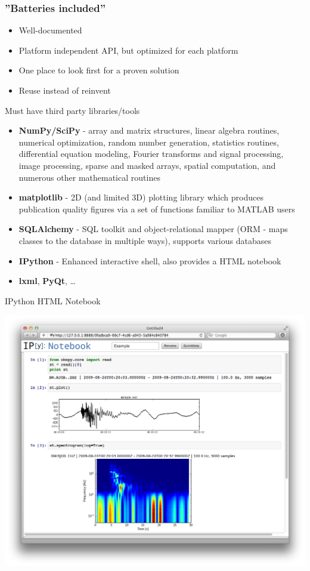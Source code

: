 \documentclass[handout]{beamer}
\begin{document}
\begin{frame}
    \frametitle{''Batteries included''}
    \begin{itemize}
        \item Well-documented
        \item Platform independent API, but optimized for each platform
        \item One place to look first for a proven solution
        \item Reuse instead of reinvent
    \end{itemize}
\end{frame}


\begin{frame}[plain]{Must have third party libraries/tools}
    \begin{itemize}
        \item \textbf{NumPy/SciPy} - array and matrix structures, linear algebra routines, numerical optimization, random number generation, statistics routines, differential equation modeling, Fourier transforms and signal processing, image processing, sparse and masked arrays, spatial computation, and numerous other mathematical routines
        \item \textbf{matplotlib} - 2D (and limited 3D) plotting library which produces publication quality figures via a set of functions familiar to MATLAB users
        \item \textbf{SQLAlchemy} - SQL toolkit and object-relational mapper (ORM - maps classes to the database in multiple ways), supports various databases
        \item \textbf{IPython} - Enhanced interactive shell, also provides a HTML notebook
        \item \textbf{lxml}, \textbf{PyQt}, \dots
    \end{itemize}
\end{frame}

\begin{frame}[plain]{IPython HTML Notebook}
    \begin{center}
        \includegraphics[height=0.95\paperheight]{images/ipy_notebook.png}
    \end{center}
\end{frame}
\end{document}
